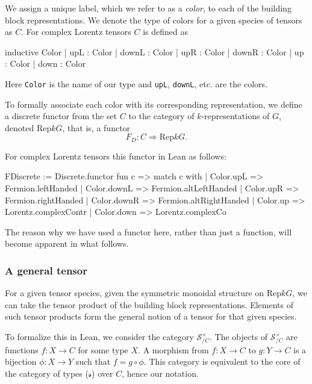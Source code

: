 \documentclass[a4paper, 11pt]{article}
\begin{document}
We assign a unique label, which we refer to as a \emph{color}, to each of the 
building block representations. We denote the type of colors for a given species of tensors as $C$.
For complex Lorentz tensors 
$C$ is defined as 
\begin{code}
inductive Color
  | upL : Color
  | downL : Color
  | upR : Color
  | downR : Color
  | up : Color
  | down : Color
\end{code}
Here \lstinline|Color| is the name of our type and \lstinline|upL|, \lstinline|downL|, etc. are the
colors. 

To formally associate each color with its corresponding representation, we define
a discrete functor from the set $C$ to the category of $k$-representations of $G$, denoted 
$\mathrm{Rep} k G$, that is, a functor
\begin{equation} 
  F_{D} : C \Rightarrow \mathrm{Rep} k G.
\end{equation}


For complex Lorentz tensors this functor in Lean as follows:
\begin{code}
FDiscrete := Discrete.functor fun c =>
  match c with
  | Color.upL => Fermion.leftHanded
  | Color.downL => Fermion.altLeftHanded
  | Color.upR => Fermion.rightHanded
  | Color.downR => Fermion.altRightHanded
  | Color.up => Lorentz.complexContr
  | Color.down => Lorentz.complexCo
\end{code}

The reason why we have used a functor here, rather than just a function, will become apparent
in what follows.


\subsubsection{A general tensor}

For a given tensor species, given the symmetric monoidal structure on $\mathrm{Rep} k G$, 
we can take the tensor product of the building block representations. 
Elements of such tensor products form the general notion of a tensor for that given 
species. 

To formalize this in Lean, we consider the category  $\mathcal{S}_{/C}^\times$. The objects 
of $\mathcal{S}_{/C}^\times$ are functions $f : X \to C$  for some type $X$. 
A morphism from $f : X \to C$ to $g : Y \to C$ is a bijection $\phi : X \to Y$ such that 
$f = g \circ \phi$. 
This category is equivalent to the core of the category of types ($\mathcal{s}$) over $C$, hence 
our notation. 
\end{document}
